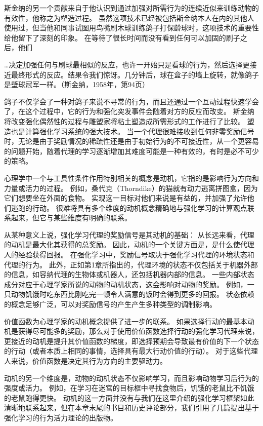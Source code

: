 {斯金纳的另一个贡献来自于他认识到通过加强对所需行为的连续近似来训练动物的有效性，他称之为塑造过程。
虽然这项技术已经被包括斯金纳本人在内的其他人使用过，但当他和同事试图用鸟嘴刷木球训练鸽子打保龄球时，这项技术的重要性给他留下了深刻的印象。
在等待了很长时间而没有看到任何可以加固的刷子之后，他们


…决定加强任何与刷球最相似的反应，也许一开始只是看球的行为，然后选择更接近最终形式的反应。结果令我们惊讶。几分钟后，球在盒子的墙上旋转，就像鸽子是壁球冠军一样。（斯金纳，1958年，第94页）


鸽子不仅学会了一种对鸽子来说不寻常的行为，而且还通过一个互动过程快速学会了，在这个过程中，它的行为和强化突发事件会随着对方的反应而改变。
斯金纳将改变强化偶然性的过程与雕塑家将粘土塑造成所需形式的工作进行了比较。
塑造也是计算强化学习系统的强大技术。
当一个代理很难接收到任何非零奖励信号时，无论是由于奖励情况的稀疏性还是由于初始行为的不可接近性，从一个更容易的问题开始，随着代理的学习逐渐增加其难度可能是一种有效的，有时是必不可少的策略。


心理学中一个与工具性条件作用特别相关的概念是动机，它指的是影响行为方向和力量或活力的过程。
例如，桑代克（Thorndike）的猫就有动力逃离拼图盒，因为它们想要坐在外面的食物。
实现这一目标对他们来说是有益的，并加强了允许他们逃跑的行动。
很难将具有多个维度的动机概念精确地与强化学习的计算观点联系起来，但它与某些维度有明确的联系。


从某种意义上说，强化学习代理的奖励信号是其动机的基础：
从长远来看，代理的动机是最大化其获得的总奖励。
因此，动机的一个关键方面是，是什么使代理人的经验获得回报。
在强化学习中，奖励信号取决于强化学习代理的环境状态和代理的行为。
此外，正如第1章所指出的，代理环境的状态不仅包括关于机器外部的信息，如容纳代理的生物体或机器人，还包括机器内部的信息。
一些内部状态成分对应于心理学家所说的动物的动机状态，这会影响对动物的奖励。
例如，一只动物饥饿时吃东西比刚吃完一顿令人满意的饭时会得到更多的回报。
状态依赖的概念足够广泛，可以对奖励信号的产生产生多种类型的调制影响。


价值函数为心理学家的动机概念提供了进一步的联系。
如果选择行动的最基本动机是获得尽可能多的奖励，那么对于使用价值函数选择行动的强化学习代理来说，更接近的动机是提升其价值函数的梯度，即选择预期会导致最有价值的下一个状态的行动（或者本质上相同的事情，选择具有最大行动价值的行动）。
对于这些代理人来说，价值函数是决定其行为方向的主要驱动力。


动机的另一个维度是，动物的动机状态不仅影响学习，而且影响动物学习后行为的强度或活力。
例如，在学习在迷宫的目标框中寻找食物后，饥饿的老鼠比不饥饿的老鼠跑得更快。
动机的这一方面并没有与我们在这里介绍的强化学习框架如此清晰地联系起来，但在本章末尾的书目和历史评论部分，我们引用了几篇提出基于强化学习的行为活力理论的出版物。


}
